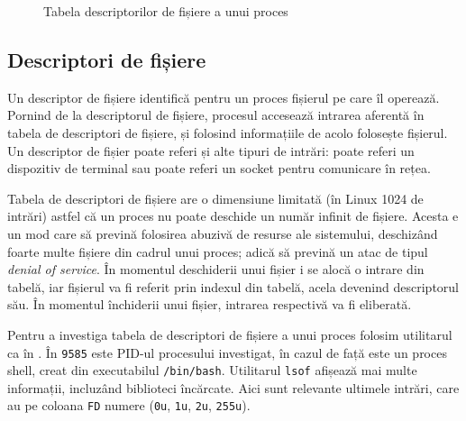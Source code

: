 \begin{figure}[!htbp]
	\centering
	\def\svgwidth{0.8\textwidth}
	
	\caption{Tabela descriptorilor de fișiere a unui proces}
	\label{fig:process:fdtab}
\end{figure}

\subsection{Descriptori de fișiere}
\label{sec:process:fd}

Un descriptor de fișiere identifică pentru un proces fișierul pe care îl
operează. Pornind de la descriptorul de fișiere, procesul accesează intrarea
aferentă în tabela de descriptori de fișiere, și folosind informațiile de acolo
folosește fișierul. Un descriptor de fișier
poate referi și alte tipuri de intrări: poate referi un dispozitiv de terminal
sau poate referi un socket pentru comunicare în rețea.

Tabela de descriptori de fișiere are o dimensiune limitată (în Linux 1024 de
intrări) astfel că un proces nu poate deschide un număr infinit de fișiere.
Acesta e un mod care să prevină folosirea abuzivă de resurse ale sistemului,
deschizând foarte multe fișiere din cadrul unui proces; adică să prevină un atac
de tipul \textit{denial of service}. În momentul deschiderii unui fișier i se alocă o
intrare din tabelă, iar fișierul va fi referit prin indexul din tabelă, acela
devenind descriptorul său. În momentul închiderii unui fișier, intrarea
respectivă va fi eliberată.

Pentru a investiga tabela de descriptori de fișiere a unui proces folosim
utilitarul  ca în .
În  \texttt{9585} este PID-ul procesului investigat, în cazul de față este un proces shell, creat din executabilul \texttt{/bin/bash}. Utilitarul \texttt{lsof} afișează mai multe informații, incluzând biblioteci încărcate. Aici sunt relevante ultimele intrări, care au pe coloana \texttt{FD} numere (\texttt{0u}, \texttt{1u}, \texttt{2u}, \texttt{255u}).

